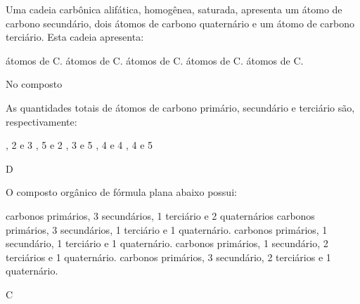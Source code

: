 \documentclass[10pt]{scrartcl}
\begin{document}
\begin{exercise}[points=1.0]
Uma cadeia carbônica alifática, homogênea, saturada, apresenta um átomo de carbono
secundário, dois átomos de carbono quaternário e um átomo de carbono terciário. Esta cadeia apresenta:

\begin{choice}
 átomos de C.
 átomos de C.
 átomos de C.
 átomos de C.
 átomos de C.
\end{choice}
\end{exercise}





\begin{exercise}[points=1.0]
No composto
\begin{center}
\end{center}
As quantidades totais de átomos de carbono primário, secundário e terciário são, respectivamente:

\begin{choice}
, 2 e 3 
, 5 e 2 
, 3 e 5
, 4 e 4
, 4 e 5
\end{choice}
\end{exercise}
\begin{solution}
D
\end{solution}



\begin{exercise}[points=1.0]
O composto orgânico de fórmula plana abaixo possui:

\begin{center}
\end{center}

\begin{choice}
 carbonos primários, 3 secundários, 1 terciário e 2 quaternários
 carbonos primários, 3 secundários, 1 terciário e 1 quaternário.
 carbonos primários, 1 secundário, 1 terciário e 1 quaternário.
 carbonos primários, 1 secundário, 2 terciários e 1 quaternário.
 carbonos primários, 3 secundário, 2 terciários e 1 quaternário.
\end{choice}
\end{exercise}
\begin{solution}
C
\end{solution}
\end{document}
